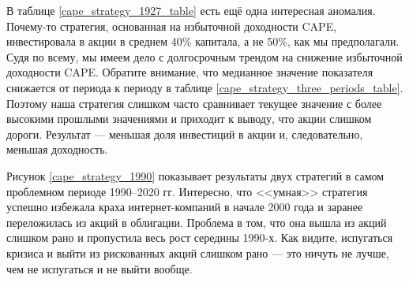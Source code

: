 В таблице \ref{cape_strategy_1927_table} есть ещё одна интересная аномалия. 
Почему-то стратегия, основанная на избыточной доходности CAPE, инвестировала в 
акции в среднем 40\% капитала, а не 50\%, как мы предполагали. Судя по всему, 
мы имеем дело с долгосрочным трендом на снижение избыточной доходности CAPE. 
Обратите внимание, что медианное значение показателя снижается от периода к 
периоду в таблице \ref{cape_strategy_three_periods_table}. Поэтому наша 
стратегия слишком часто сравнивает текущее значение с более высокими прошлыми 
значениями и приходит к выводу, что акции слишком дороги. Результат --- 
меньшая доля инвестиций в акции и, следовательно, меньшая доходность.

Рисунок \ref{cape_strategy_1990} показывает результаты двух стратегий в 
самом проблемном периоде 1990--2020 гг. Интересно, что <<умная>> 
стратегия успешно избежала краха интернет-компаний в начале 2000 года и 
заранее переложилась из акций в облигации. Проблема в том, что она вышла из 
акций слишком рано и пропустила весь рост середины 1990-х. Как видите, 
испугаться кризиса и выйти из рискованных акций слишком рано --- это ничуть не 
лучше, чем не испугаться и не выйти вообще.

